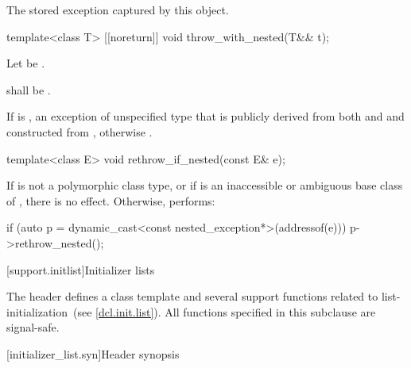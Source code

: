 \begin{itemdescr}
\pnum
\returns The stored exception captured by this  object.
\end{itemdescr}

%
\begin{itemdecl}
template<class T> [[noreturn]] void throw_with_nested(T&& t);
\end{itemdecl}

\begin{itemdescr}
\pnum
Let  be .

\pnum
\requires {} shall be .

\pnum
\throws
If 
is ,
an exception of unspecified type that is publicly derived from both
 and 
and constructed from , otherwise
.
\end{itemdescr}

%
\begin{itemdecl}
template<class E> void rethrow_if_nested(const E& e);
\end{itemdecl}

\begin{itemdescr}
\pnum
\effects
If  is not a polymorphic class type, or
if  is an inaccessible or ambiguous base class of ,
there is no effect.
Otherwise, performs:
\begin{codeblock}
if (auto p = dynamic_cast<const nested_exception*>(addressof(e)))
  p->rethrow_nested();
\end{codeblock}
\end{itemdescr}

[support.initlist]{Initializer lists}

%
\pnum
The header  defines a class template and several
support functions related to list-initialization~(see \ref{dcl.init.list}).
%
All functions specified in this subclause are signal-safe.

[initializer_list.syn]{Header  synopsis}
%
%
%

